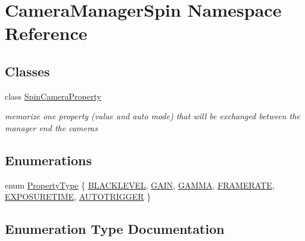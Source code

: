 \hypertarget{namespace_camera_manager_spin}{}\section{Camera\+Manager\+Spin Namespace Reference}
\label{namespace_camera_manager_spin}
\subsection*{Classes}
\begin{DoxyCompactItemize}
\item 
class \mbox{\hyperlink{class_camera_manager_spin_1_1_spin_camera_property}{Spin\+Camera\+Property}}
\begin{DoxyCompactList}\small\item\em memorize one property (value and auto mode) that will be exchanged between the manager end the cameras \end{DoxyCompactList}\end{DoxyCompactItemize}
\subsection*{Enumerations}
\begin{DoxyCompactItemize}
\item 
enum \mbox{\hyperlink{namespace_camera_manager_spin_ab89e54b93aaaec5c9a411f5b6aadde0c}{Property\+Type}} \{ \newline
\mbox{\hyperlink{namespace_camera_manager_spin_ab89e54b93aaaec5c9a411f5b6aadde0cab2b18d0ce741dd1becf5ce76dd31940e}{B\+L\+A\+C\+K\+L\+E\+V\+EL}}, 
\mbox{\hyperlink{namespace_camera_manager_spin_ab89e54b93aaaec5c9a411f5b6aadde0ca8b13197ea2e153451254221705be61a6}{G\+A\+IN}}, 
\mbox{\hyperlink{namespace_camera_manager_spin_ab89e54b93aaaec5c9a411f5b6aadde0caa8eaae69a280fdee7f428ce10c08f62d}{G\+A\+M\+MA}}, 
\mbox{\hyperlink{namespace_camera_manager_spin_ab89e54b93aaaec5c9a411f5b6aadde0ca674ee032d38e39fc5c15d8ccaec26847}{F\+R\+A\+M\+E\+R\+A\+TE}}, 
\newline
\mbox{\hyperlink{namespace_camera_manager_spin_ab89e54b93aaaec5c9a411f5b6aadde0caeaf06ae05168696e22568c8bb9c48b27}{E\+X\+P\+O\+S\+U\+R\+E\+T\+I\+ME}}, 
\mbox{\hyperlink{namespace_camera_manager_spin_ab89e54b93aaaec5c9a411f5b6aadde0ca4969afd7ecaae64f19ea3a5d58b44a00}{A\+U\+T\+O\+T\+R\+I\+G\+G\+ER}}
 \}
\end{DoxyCompactItemize}


\subsection{Enumeration Type Documentation}
\mbox{\label{namespace_camera_manager_spin_ab89e54b93aaaec5c9a411f5b6aadde0c}} 
